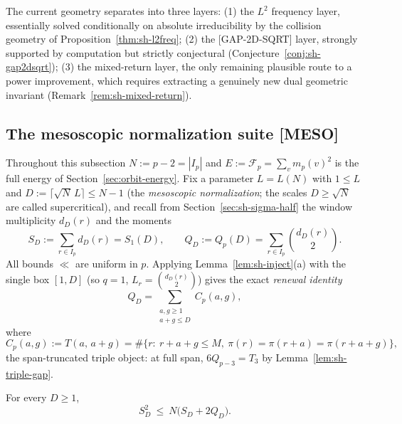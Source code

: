 \begin{remark}
\label{rem:sh-classification}
The current geometry separates into three layers:
(1) the $L^2$ frequency layer, essentially solved conditionally on
absolute irreducibility by the collision geometry of
Proposition~\ref{thm:sh-l2freq};
(2) the [GAP-2D-SQRT] layer, strongly supported by computation but
strictly conjectural (Conjecture~\ref{conj:sh-gap2dsqrt});
(3) the mixed-return layer, the only remaining plausible route to a
power improvement, which requires extracting a genuinely new dual
geometric invariant (Remark~\ref{rem:sh-mixed-return}).
\end{remark}

\subsection{The mesoscopic normalization suite [MESO]}
\label{sec:sh-meso}

Throughout this subsection $N:=p-2=|I_p|$ and
$E:=\mathcal F_p=\sum_vm_p(v)^2$ is the full energy of
Section~\ref{sec:orbit-energy}.  Fix a parameter $L=L(N)$ with
$1\le L$ and $D:=\lceil\sqrt N\,L\rceil\le N-1$ (the \emph{mesoscopic
normalization}; the scales $D\ge\sqrt N$ are called supercritical), and
recall from Section~\ref{sec:sh-sigma-half} the window multiplicity
$d_D(r)$ and the moments
\[
 S_D:=\sum_{r\in I_p}d_D(r)=S_1(D),
 \qquad
 Q_D:=Q_p(D)=\sum_{r\in I_p}\binom{d_D(r)}{2}.
\]
All bounds $\ll$ are uniform in $p$.  Applying
Lemma~\ref{lem:sh-inject}(a) with the single box $[1,D]$ (so $q=1$,
$L_r=\binom{d_D(r)}{2}$) gives the exact \emph{renewal identity}
\begin{equation}\label{eq:sh-meso-renewal}
 Q_D=\sum_{\substack{a,g\ge1\\ a+g\le D}}C_p(a,g),
\end{equation}
where
\[
 C_p(a,g):=T(a,\,a+g)
 =\#\{r:\ r+a+g\le M,\ \pi(r)=\pi(r+a)=\pi(r+a+g)\},
\]
the span-truncated triple object: at full span,
$6Q_{p-3}=T_3$ by Lemma~\ref{lem:sh-triple-gap}.

\begin{lemma}\label{lem:sh-meso-capacity}
For every $D\ge1$,
\[
 S_D^2\ \le\ N\bigl(S_D+2Q_D\bigr).
\]
\end{lemma}

